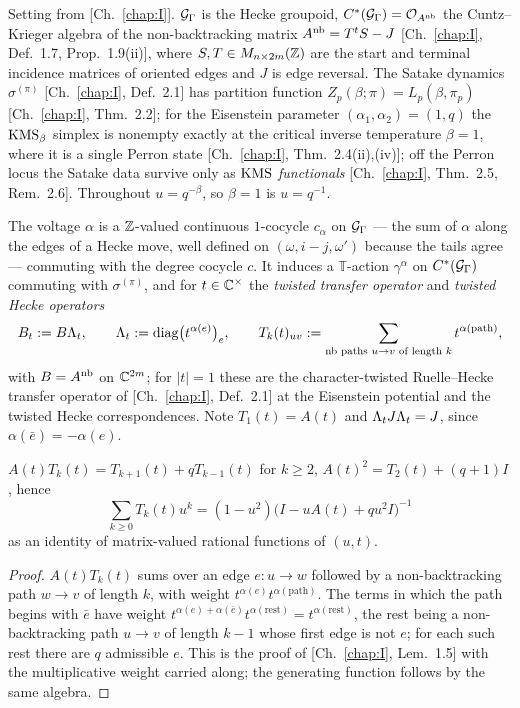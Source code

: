Setting from [Ch.~\ref{chap:I}]. $\mathcal{G}_\Gamma$ is the Hecke groupoid, $C^*(\mathcal{G}_\Gamma)=\mathcal{O}_{A^{\mathrm{nb}}}$ the
Cuntz--Krieger algebra of the non-backtracking matrix
$A^{\mathrm{nb}}=T^{t}S-J$ [Ch.~\ref{chap:I}, Def.~1.7, Prop.~1.9(ii)], where $S,T\in M_{n\times2m}(\mathbb{Z})$ are the
start and terminal incidence matrices of oriented edges and $J$ is edge reversal. The
Satake dynamics $\sigma^{(\pi)}$ [Ch.~\ref{chap:I}, Def.~2.1] has partition function
$Z_p(\beta;\pi)=L_p(\beta,\pi_p)$ [Ch.~\ref{chap:I}, Thm.~2.2]; for the Eisenstein parameter
$(\alpha_1,\alpha_2)=(1,q)$ the $\mathrm{KMS}_\beta$ simplex is nonempty exactly at the critical
inverse temperature $\beta=1$, where it is a single Perron state [Ch.~\ref{chap:I}, Thm.~2.4(ii),(iv)];
off the Perron locus the Satake data survive only as $\mathrm{KMS}$ \emph{functionals}
[Ch.~\ref{chap:I}, Thm.~2.5, Rem.~2.6]. Throughout $u=q^{-\beta}$, so $\beta=1$ is $u=q^{-1}$.

\begin{definition}\label{IX:def:twist}
The voltage $\alpha$ is a $\mathbb{Z}$-valued continuous $1$-cocycle $c_\alpha$ on
$\mathcal{G}_\Gamma$ --- the sum of $\alpha$ along the edges of a Hecke move, well defined on
$(\omega,i-j,\omega')$ because the tails agree --- commuting with the degree cocycle
$c$. It induces a $\mathbb T$-action $\gamma^{\alpha}$ on $C^*(\mathcal{G}_\Gamma)$ commuting
with $\sigma^{(\pi)}$, and for $t\in\mathbb{C}^{\times}$ the \emph{twisted transfer operator} and
\emph{twisted Hecke operators}
\[
B_t:=B\Lambda_t,\qquad \Lambda_t:=\operatorname{diag}\bigl(t^{\alpha(e)}\bigr)_{e},\qquad
T_k(t)_{uv}:=\sum_{\text{nb paths }u\to v\text{ of length }k}t^{\alpha(\text{path})},
\]
with $B=A^{\mathrm{nb}}$ on $\mathbb{C}^{2m}$; for $|t|=1$ these are the character-twisted Ruelle--Hecke
transfer operator of [Ch.~\ref{chap:I}, Def.~2.1] at the Eisenstein potential and the twisted Hecke
correspondences. Note $T_1(t)=A(t)$ and $\Lambda_tJ\Lambda_t=J$, since $\alpha(\bar e)=-\alpha(e)$.
\end{definition}

\begin{lemma}\label{IX:lem:rec}
$A(t)T_k(t)=T_{k+1}(t)+qT_{k-1}(t)$ for $k\ge2$, $A(t)^{2}=T_2(t)+(q{+}1)I$, hence
\[
\sum_{k\ge0}T_k(t)u^{k}=(1-u^{2})\bigl(I-uA(t)+qu^{2}I\bigr)^{-1}
\]
as an identity of matrix-valued rational functions of $(u,t)$.
\end{lemma}

\begin{proof}
$A(t)T_k(t)$ sums over an edge $e\colon u\to w$ followed by a non-backtracking path
$w\to v$ of length $k$, with weight $t^{\alpha(e)}t^{\alpha(\text{path})}$. The terms in
which the path begins with $\bar e$ have weight $t^{\alpha(e)+\alpha(\bar e)}
t^{\alpha(\text{rest})}=t^{\alpha(\text{rest})}$, the rest being a non-backtracking path
$u\to v$ of length $k-1$ whose first edge is not $e$; for each such rest there are $q$
admissible $e$. This is the proof of [Ch.~\ref{chap:I}, Lem.~1.5] with the multiplicative weight
carried along; the generating function follows by the same algebra.
\end{proof}

